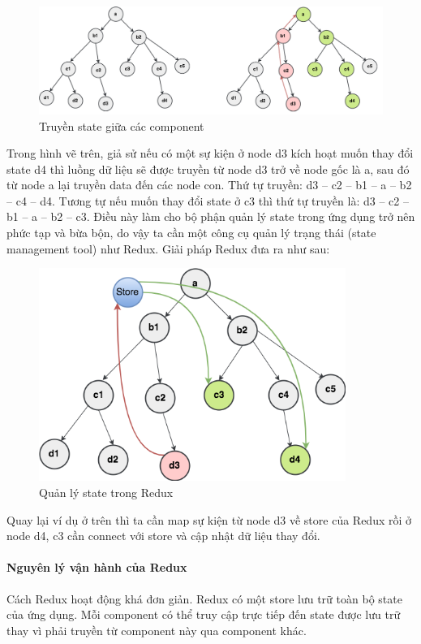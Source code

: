\begin{figure}[H]
\centering
\includegraphics[width=16cm]{images/redux-state-transfer.png}
\caption{Truyền state giữa các component}
\end{figure}

Trong hình vẽ trên, giả sử nếu có một sự kiện ở node d3 kích
hoạt muốn thay đổi state d4 thì luồng dữ liệu sẽ được truyền
từ node d3 trở về node gốc là a, sau đó từ node a lại truyền data
đến các node con. Thứ tự truyền: d3 – c2 – b1 – a – b2 – c4 – d4.
Tương tự nếu muốn thay đổi state ở c3 thì thứ tự truyền là:
d3 – c2 – b1 – a – b2 – c3. Điều này làm cho bộ phận quản lý
state trong ứng dụng trở nên phức tạp và bừa bộn, do vậy ta
cần một công cụ quản lý trạng thái (state management tool)
như Redux. Giải pháp Redux đưa ra như sau:

\begin{figure}[H]
\centering
\includegraphics[width=10cm]{images/redux-solution.png}
\caption{Quản lý state trong Redux}
\end{figure}

Quay lại ví dụ ở trên thì ta cần map sự kiện từ node d3
về store của Redux rồi ở node d4, c3 cần connect với store
và cập nhật dữ liệu thay đổi.

\paragraph{Nguyên lý vận hành của Redux}
Cách Redux hoạt động khá đơn giản. Redux có một store lưu trữ
toàn bộ state của ứng dụng. Mỗi component có thể truy cập trực
tiếp đến state được lưu trữ thay vì phải truyền từ component
này qua component khác.

